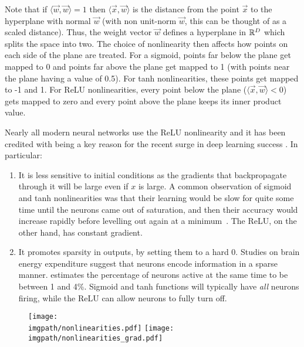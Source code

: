 Note that if $\langle\vec{w}, \vec{w}\rangle = 1$ then $\langle\vec{x},
\vec{w}\rangle$ is the distance from the point $\vec{x}$ to the hyperplane with
normal $\vec{w}$ (with non unit-norm $\vec{w}$, this can be thought of as a scaled
distance). Thus, the weight vector $\vec{w}$ defines a hyperplane in $\reals[D]$
which splits the space into two. The choice of nonlinearity then affects how
points on each side of the plane are treated. For a sigmoid, points far below
the plane get mapped to 0 and points far above the plane get mapped to 1 (with
points near the plane having a value of 0.5). For tanh nonlinearities, these
points get mapped to -1 and 1. For ReLU nonlinearities, every point below the
plane ($\langle\vec{x}, \vec{w}\rangle < 0$) gets mapped to zero and every point
above the plane keeps its inner product value. 

Nearly all modern neural networks use the ReLU nonlinearity and it has
been credited with being a key reason for the recent surge in deep learning
success \cite{glorot_deep_2011, nair_rectified_2010}. In particular:
\begin{enumerate}
\item It is less sensitive to initial conditions as the gradients that
  backpropagate through it will be large even if $x$ is large. A common
  observation of sigmoid and tanh nonlinearities was that their learning would
  be slow for quite some time until the neurons came out of saturation, and then
  their accuracy would increase rapidly before levelling out again at
  a minimum~\cite{glorot_understanding_2010}. The ReLU, on the other hand, has
  constant gradient.
\item It promotes sparsity in outputs, by setting them to a hard 0. Studies
  on brain energy expenditure suggest that neurons encode information in
  a sparse manner. \cite{lennie_cost_2003} estimates the percentage of
  neurons active at the same time to be between 1 and 4\%. Sigmoid and tanh
  functions will typically have \emph{all} neurons firing, while 
  the ReLU can allow neurons to fully turn off.
\end{enumerate}

\begin{figure}
    \qquad
    \texttt{[image: \\imgpath/nonlinearities.pdf]}
    \quad
    \texttt{[image: \\imgpath/nonlinearities\_grad.pdf]}
  \centering
  \label{fig:ch2:nonlinearities}
\end{figure}

